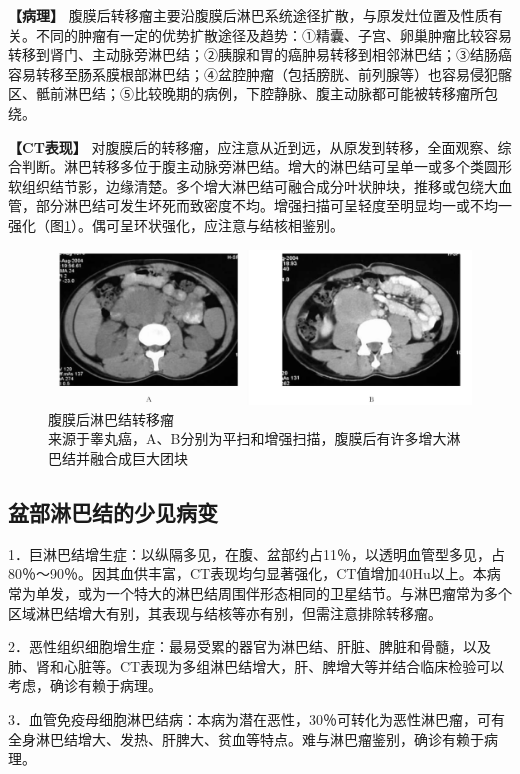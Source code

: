 \textbf{【病理】}
腹膜后转移瘤主要沿腹膜后淋巴系统途径扩散，与原发灶位置及性质有关。不同的肿瘤有一定的优势扩散途径及趋势：①精囊、子宫、卵巢肿瘤比较容易转移到肾门、主动脉旁淋巴结；②胰腺和胃的癌肿易转移到相邻淋巴结；③结肠癌容易转移至肠系膜根部淋巴结；④盆腔肿瘤（包括膀胱、前列腺等）也容易侵犯髂区、骶前淋巴结；⑤比较晚期的病例，下腔静脉、腹主动脉都可能被转移瘤所包绕。

\textbf{【CT表现】}
对腹膜后的转移瘤，应注意从近到远，从原发到转移，全面观察、综合判断。淋巴转移多位于腹主动脉旁淋巴结。增大的淋巴结可呈单一或多个类圆形软组织结节影，边缘清楚。多个增大淋巴结可融合成分叶状肿块，推移或包绕大血管，部分淋巴结可发生坏死而致密度不均。增强扫描可呈轻度至明显均一或不均一强化（图\ref{fig19-5}）。偶可呈环状强化，应注意与结核相鉴别。

\begin{figure}[!htbp]
 \centering
 \includegraphics[width=.7\textwidth,height=\textheight,keepaspectratio]{./images/Image00386.jpg}
 \captionsetup{justification=centering}
 \caption{腹膜后淋巴结转移瘤\\{\small 来源于睾丸癌，A、B分别为平扫和增强扫描，腹膜后有许多增大淋巴结并融合成巨大团块}}
 \label{fig19-5}
  \end{figure} 

\subsection{盆部淋巴结的少见病变}

1．巨淋巴结增生症：以纵隔多见，在腹、盆部约占11％，以透明血管型多见，占80％～90％。因其血供丰富，CT表现均匀显著强化，CT值增加40Hu以上。本病常为单发，或为一个特大的淋巴结周围伴形态相同的卫星结节。与淋巴瘤常为多个区域淋巴结增大有别，其表现与结核等亦有别，但需注意排除转移瘤。

2．恶性组织细胞增生症：最易受累的器官为淋巴结、肝脏、脾脏和骨髓，以及肺、肾和心脏等。CT表现为多组淋巴结增大，肝、脾增大等并结合临床检验可以考虑，确诊有赖于病理。

3．血管免疫母细胞淋巴结病：本病为潜在恶性，30％可转化为恶性淋巴瘤，可有全身淋巴结增大、发热、肝脾大、贫血等特点。难与淋巴瘤鉴别，确诊有赖于病理。

